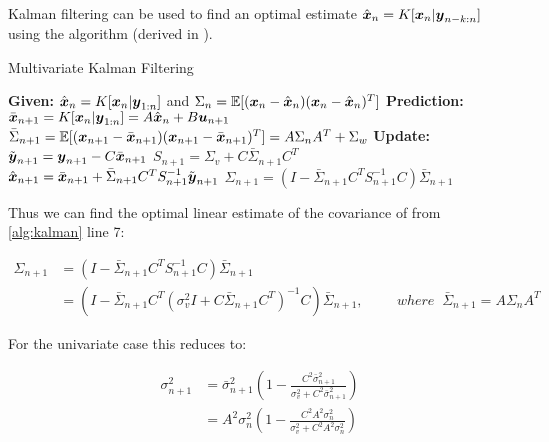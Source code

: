 \documentclass[../main.tex]{subfiles}
\begin{document}
{{Kalman filtering can be used to find an optimal estimate $\hat{\boldsymbol{x}}_n = K[\boldsymbol{x}_n | \boldsymbol{y}_{n-k:n}]$ using the algorithm (derived in \cite{4f7}).

\begin{algorithm}[h]
    \caption{Multivariate Kalman Filtering}
    \label{alg:kalman}
    \begin{algorithmic}[1]
        \State \textbf{Given:} $\hat{\boldsymbol{x}}_n = K[\boldsymbol{x}_n | \boldsymbol{y}_{1:n}]$ and $\Sigma_n = \mathbb{E}[(\boldsymbol{x}_n - \hat{\boldsymbol{x}}_n)(\boldsymbol{x}_n - \hat{\boldsymbol{x}}_n)^T]$
       \Statex
       \Statex \textbf{Prediction:}
       \State $\bar{\boldsymbol{x}}_{n+1} = K[\boldsymbol{x}_n | \boldsymbol{y}_{1:n}] = A \hat{\boldsymbol{x}}_n + B \boldsymbol{u}_{n+1}$
       \State $\bar{\Sigma}_{n+1} = \mathbb{E}[(\boldsymbol{x}_{n+1} - \bar{\boldsymbol{x}}_{n+1})(\boldsymbol{x}_{n+1} - \bar{\boldsymbol{x}}_{n+1})^T] = A \Sigma_n A^T + \Sigma_w$
       \Statex
       \Statex \textbf{Update:}
       \State $\tilde{\boldsymbol{y}}_{n+1} = \boldsymbol{y}_{n+1} - C\bar{\boldsymbol{x}}_{n+1}$
       \State $S_{n+1} = \Sigma_v + C \bar{\Sigma}_{n+1} C^T$
       \State $\hat{\boldsymbol{x}}_{n+1} = \bar{\boldsymbol{x}}_{n+1} + \bar{\Sigma}_{n+1}C^T S_{n+1}^{-1} \tilde{\boldsymbol{y}}_{n+1}$
       \State $\Sigma_{n+1} = (I - \bar{\Sigma}_{n+1}C^T S_{n+1}^{-1} C)\bar{\Sigma}_{n+1}$
    \end{algorithmic}
 \end{algorithm}

 Thus we can find the optimal linear estimate of the covariance of  from \cref{alg:kalman} line 7:

 \begin{align}
    \Sigma_{n+1} &= (I - \bar{\Sigma}_{n+1}C^T S_{n+1}^{-1} C)\bar{\Sigma}_{n+1} \\
    &= (I - \bar{\Sigma}_{n+1}C^T (\sigma_v^2 I + C \bar{\Sigma}_{n+1} C^T)^{-1} C)\bar{\Sigma}_{n+1}, \hspace{1cm} where \;\; \bar{\Sigma}_{n+1} = A \Sigma_n A^T
 \end{align}

 For the univariate case this reduces to:

 \begin{align}
    \sigma_{n+1}^2 &= \bar{\sigma}_{n+1}^2 (1 - \frac{C^2 \bar{\sigma}_{n+1}^2}{\sigma_v^2 + C^2 \bar{\sigma}_{n+1}^2}) \\
    &= A^2\sigma_n^2(1 - \frac{C^2 A^2\sigma_n^2}{\sigma_v^2 + C^2 A^2 \sigma_n^2})
 \end{align}
}

}
\end{document}
